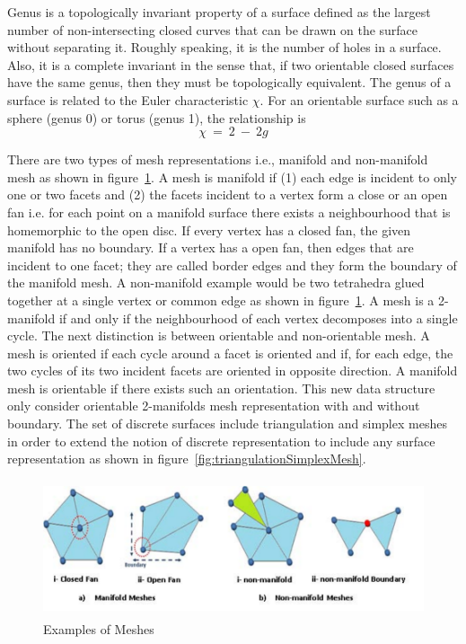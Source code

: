 \documentclass{InsightArticle}
\begin{document}
Genus is a topologically invariant property of a surface defined as the largest number of non-intersecting closed curves that can be drawn on the surface without separating it. Roughly speaking, it is the number of holes in a surface. Also, it is a complete invariant in the sense that, if two orientable closed surfaces have the same genus, then they must be topologically equivalent. The genus of a surface is related to the Euler characteristic $\chi$. For an orientable surface such as a sphere (genus 0) or torus (genus 1), the relationship is
\begin{equation}
\chi~=~2~-~2g
\end{equation}

There are two types of mesh representations i.e., manifold and non-manifold mesh as shown in figure~\ref{fig:meshes}. A mesh is manifold if (1) each edge is incident to only one or two facets and (2) the facets incident to a vertex form a close or an open fan i.e. for each point on a manifold surface there exists a neighbourhood that is homemorphic to the open disc. If every vertex has a closed fan, the given manifold has no boundary. If a vertex has a open fan, then edges that are incident to one facet; they are called border edges and they form the boundary of the manifold mesh. A non-manifold example would be two tetrahedra glued together at a single vertex or common edge as shown in figure~\ref{fig:meshes}. A mesh is a 2-manifold if and only if the neighbourhood of each vertex decomposes into a single cycle. The next distinction is between orientable and non-orientable mesh. A mesh is oriented if each cycle around a facet is oriented and if, for each edge, the two cycles of its two incident facets are oriented in opposite direction. A manifold mesh is orientable if there exists such an orientation. This new data structure only consider orientable 2-manifolds mesh representation with and without boundary. The set of discrete surfaces include triangulation and simplex meshes in order to extend the notion of discrete representation to include any surface representation as shown in figure~\ref{fig:triangulationSimplexMesh}.
\begin{figure}[!t]
	\centering
	\includegraphics[width=155mm, height=40mm]{Meshes}
	\caption{Examples of Meshes}
	\label{fig:meshes}
\end{figure}
\end{document}
